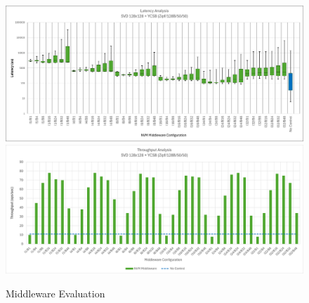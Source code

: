 

%
\label{appendix:b}

\begin{figure}[ht]
    \centering
    \includegraphics[width=\textwidth,height=\textheight,keepaspectratio,angle=0]{images/middleware-latency.png}
    \includegraphics[width=\textwidth,height=\textheight,keepaspectratio,angle=0]{images/middleware-tp.png}
    \caption{Middleware Evaluation}
    \label{fig:middleware_eval}
  \end{figure}
